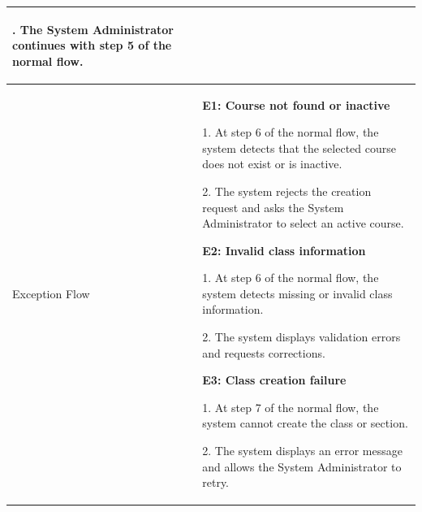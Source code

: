 \begin{longtable}{|>{\bfseries\raggedright\arraybackslash}p{}|>{\raggedright\arraybackslash}p{}|}
3. The System Administrator continues with step 5 of the normal flow. \\ \hline
Exception Flow &
\textbf{E1: Course not found or inactive} \par
1. At step 6 of the normal flow, the system detects that the selected course does not exist or is inactive. \par
2. The system rejects the creation request and asks the System Administrator to select an active course. \par\vspace{4pt}
\textbf{E2: Invalid class information} \par
1. At step 6 of the normal flow, the system detects missing or invalid class information. \par
2. The system displays validation errors and requests corrections. \par\vspace{4pt}
\textbf{E3: Class creation failure} \par
1. At step 7 of the normal flow, the system cannot create the class or section. \par
2. The system displays an error message and allows the System Administrator to retry. \\ \hline
\end{longtable}


